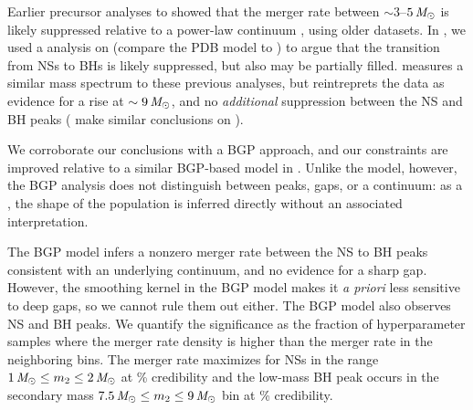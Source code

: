 Earlier precursor analyses to \PDB showed that the merger rate between $\sim 3$--$5\,\mathit{M_\odot}$ is likely suppressed relative to a power-law continuum \citep{Fishbach:2020ryj, LIGOScientific:2020kqk, Farah:2021qom}, using older datasets.
In \cite{KAGRA:2021duu}, we used a \parametricAdj analysis on \gwtcthree (compare the PDB model to \PDB) to argue that the transition from \acp{NS} to \acp{BH} is likely suppressed, but also may be partially filled.
\PDB measures a similar mass spectrum to these previous analyses, but reintreprets the data as evidence for a rise at $\sim 9\,\mathit{M_\odot}$, and no \textit{additional} suppression between the \ac{NS} and \ac{BH} peaks (\citealt{Mali:2024wpq} make similar conclusions on \gwtcthree).

We corroborate our \parametricAdj \PDB conclusions with a \nonparametricAdj \ac{BGP} approach, and our constraints are improved relative to a similar \ac{BGP}-based model in \cite{KAGRA:2021duu}. 
Unlike the \PDB model, however, the \ac{BGP} analysis does not distinguish between peaks, gaps, or a continuum: as a \nonparametric, the shape of the population is inferred directly without an associated interpretation.

The \ac{BGP} model infers a nonzero merger rate between the \ac{NS} to \ac{BH} peaks consistent with an underlying continuum, and no evidence for a sharp gap. 
However, the smoothing kernel in the \ac{BGP} model makes it \textit{a priori} less sensitive to deep gaps, so we cannot rule them out either.
The \ac{BGP} model also observes \ac{NS} and \ac{BH} peaks. We quantify the significance as the fraction of hyperparameter samples where the merger rate density is higher than the merger rate in the neighboring bins. 
The merger rate maximizes for \acp{NS} in the range $1\,\mathit{M_\odot} \leq m_2 \leq 2\,\mathit{M_\odot}$ at \FullMassSpectrumBGPPeakSignificance[m2_peaks][(1, 2)]\% credibility and the low-mass \ac{BH} peak occurs in the secondary mass $7.5\,\mathit{M_\odot} \leq m_2 \leq 9\,\mathit{M_\odot}$ bin at \FullMassSpectrumBGPPeakSignificance[m2_peaks][(7.23021864, 9.2586008)]\% credibility.

